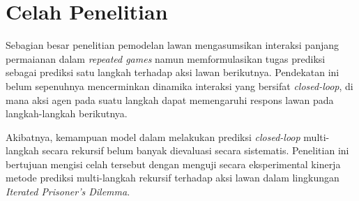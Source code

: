 \section{Celah Penelitian}

Sebagian besar penelitian pemodelan lawan mengasumsikan interaksi panjang permaianan dalam \textit{repeated games} namun memformulasikan tugas prediksi sebagai prediksi satu langkah terhadap aksi lawan berikutnya. Pendekatan ini belum sepenuhnya mencerminkan dinamika interaksi yang bersifat \textit{closed-loop}, di mana aksi agen pada suatu langkah dapat memengaruhi respons lawan pada langkah-langkah berikutnya.

Akibatnya, kemampuan model dalam melakukan prediksi \textit{closed-loop} multi-langkah secara rekursif belum banyak dievaluasi secara sistematis. Penelitian ini bertujuan mengisi celah tersebut dengan menguji secara eksperimental kinerja metode prediksi multi-langkah rekursif terhadap aksi lawan dalam lingkungan \textit{Iterated Prisoner's Dilemma}.





